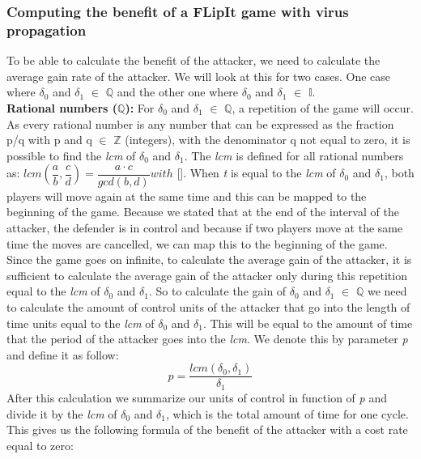 \subsubsection{Computing the benefit of a FLipIt game with virus propagation}

To be able to calculate the benefit of the attacker, we need to calculate the average gain rate of the attacker. We will look at this for two cases. One case where $\delta_{0}$ and $\delta_{1}$ $\in$ \(\mathbb{Q}\) and the other one where $\delta_{0}$ and $\delta_{1}$ $\in$ \(\mathbb{I}.\) \\

\textbf{Rational numbers (\(\mathbb{Q}\)):} For $\delta_{0}$ and $\delta_{1}$ $\in$ \(\mathbb{Q}\), a repetition of the game will occur. As every rational number is any number that can be expressed as the fraction p/q with p and q $\in$ \(\mathbb{Z}\) (integers), with the denominator q not equal to zero, it is possible to find the \textit{lcm} of $\delta_{0}$ and $\delta_{1}$. The \textit{lcm} is defined for all rational numbers as: $lcm(\dfrac{a}{b},\dfrac{c}{d})= \dfrac{a \cdot c}{gcd(b,d)} with  $ []. When \textit{t} is equal to the \textit{lcm} of $\delta_{0}$ and $\delta_{1}$, both players will move again at the same time and this can be mapped to the beginning of the game. Because we stated that at the end of the interval of the attacker, the defender is in control and because if two players move at the same time the moves are cancelled, we can map this to the beginning of the game. Since the game goes on infinite, to calculate the average gain of the attacker, it is sufficient to calculate the average gain of the attacker only during this repetition equal to the \textit{lcm} of $\delta_{0}$ and $\delta_{1}$. 
So to calculate the gain of $\delta_{0}$ and $\delta_{1}$ $\in$ \(\mathbb{Q}\) we need to calculate the amount of control units of the attacker that go into the length of time units equal to the \textit{lcm} of  $\delta_{0}$ and $\delta_{1}$. This will be equal to the amount of time that the period of the attacker goes into the \textit{lcm}. We denote this by parameter \textit{p} and define it as follow:
\begin{equation}\label{first}
p = \dfrac{lcm(\delta_{0},\delta_{1})}{\delta_{1} } 
\end{equation}
After this calculation we summarize our units of control in function of \textit{p} and divide it by the \textit{lcm} of $\delta_{0} $ and $ \delta_{1}$, which is the total amount of time for one cycle.  This gives us the following formula of the benefit of the attacker with a cost rate equal to zero:

